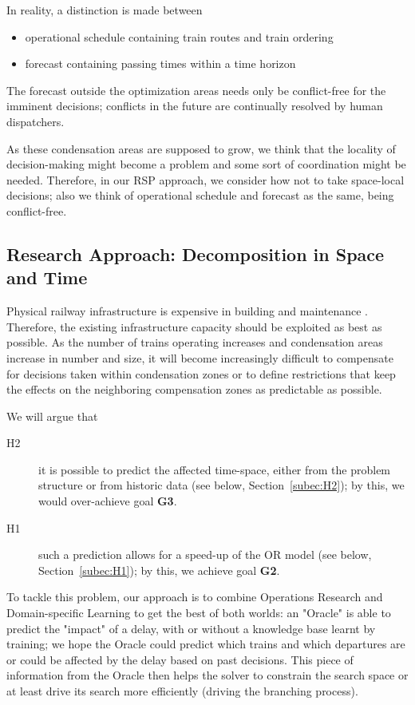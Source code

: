 \documentclass{article}
\begin{document}
In reality, a distinction is made between
\begin{itemize}
    \item operational schedule containing train routes and train ordering
    \item forecast containing passing times within a time horizon
\end{itemize}
%
The forecast outside the optimization areas needs only be conflict-free for the imminent decisions; conflicts in the future are continually resolved by human dispatchers.

As these condensation areas are supposed to grow, we think that the locality of decision-making might become a problem and some sort of coordination might be needed.
%
Therefore, in our RSP approach, we consider how not to take space-local decisions; also we think of operational schedule and forecast as the same, being conflict-free.

\subsection{Research Approach: Decomposition in Space and Time}
Physical railway infrastructure is expensive in building and maintenance \cite{sr40programm}.
Therefore, the existing infrastructure capacity should be exploited as best as possible.
As the number of trains operating increases and condensation areas increase in number and size, it will become increasingly difficult to compensate for decisions taken within condensation zones or to define restrictions that keep the effects on the neighboring compensation zones as predictable as possible.

We will argue that
\begin{description}
\item [H2] it is possible to predict the affected time-space, either from the problem structure or from historic data (see below, Section~\ref{subec:H2}); by this, we would over-achieve goal \textbf{G3}.
\item [H1] such a prediction allows for a speed-up of the OR model (see below, Section~\ref{subec:H1}); by this, we achieve goal \textbf{G2}.
\end{description}



To tackle this problem, our approach is to combine Operations Research and Domain-specific Learning to get the best of both worlds: an "Oracle" is able to predict the "impact" of a delay, with or without a knowledge base learnt by training; we hope the Oracle could predict which trains and which departures are or could be affected by the delay based on past decisions. This piece of information from the Oracle then helps the solver to constrain the search space or at least drive its search more efficiently (driving the branching process).
\end{document}
